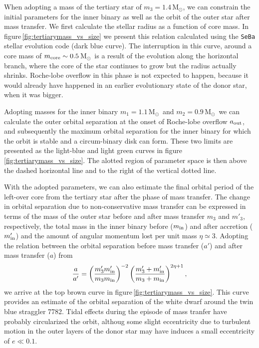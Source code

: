 \documentclass{aastex62}
\newcommand{\MSun}{\mbox{M$_\odot$}}
\begin{document}
When adopting a mass of the tertiary star of $m_3 = 1.4$\,\MSun, we
can constrain the initial parameters for the inner binary as well as
the orbit of the outer star after mass transfer. We first calculate
the stellar radius as a function of core mass. In
figure\,\ref{fig:tertiarymass_vs_size} we present this relation
calculated using the {\tt SeBa} stellar evolution code
\cite{1996A&A...309..179P} (dark blue curve).  The interruption in
this curve, around a core mass of $m_{\rm core} \sim 0.5$\,\MSun\, is
a result of the evolution along the horizontal branch, where the core
of the star continues to grow but the radius actually shrinks.
Roche-lobe overflow in this phase is not expected to happen, because
it would already have happened in an earlier evolutionary state of the
donor star, when it was bigger.

Adopting masses for the inner binary $m_1=1.1$\,\MSun\, and
$m_2=0.9$\,\MSun\, we can calculate the outer orbital separation at
the onset of Roche-lobe overflow $a_{\rm out}$, and subsequently the
maximum orbital separation for the inner binary for which the orbit is
stable and a circum-binary disk can form. These two limits are
presented as the light-blue and light green curves in
figure\,\ref{fig:tertiarymass_vs_size}.  The alotted region of
parameter space is then above the dashed horizontal line and to the
right of the vertical dotted line.

With the adopted parameters, we can also estimate the final orbital
period of the left-over core from the tertiary star after the phase of
mass transfer.  The change in orbital separation due to
non-conservative mass transfer can be expressed in terms of the mass
of the outer star before and after mass transfer $m_3$ and $m'_3$,
respectively, the total mass in the inner binary before ($m_{\rm in}$)
and after accretion ($m'_{\rm in}$) and the amount of angular momentum
lost per unit mass $\eta \simeq 3$. Adopting the relation between the
orbital separation before mass transfer ($a'$) and after mass transfer
($a$) from \cite{1995A&A...296..691P}
\begin{equation}
  {a \over a'} = \left( {m'_3 m'_{\rm in} \over m_3 m_{\rm in}} \right)^{-2}
  \left( {m'_3 + m'_{\rm in} \over m_3 + m_{\rm in}} \right)^{2\eta + 1},
\end{equation}
we arrive at the top brown curve in
figure\,\ref{fig:tertiarymass_vs_size}. This curve provides an
estimate of the orbital separation of the white dwarf around the twin
blue straggler 7782. Tidal effects during the episode of mass tranfer
have probably circularized the orbit, althoug some slight eccentricity
due to turbulent motion in the outer layers of the donor star may have
induces a small eccentricity of $e \ll 0.1$.
\end{document}

